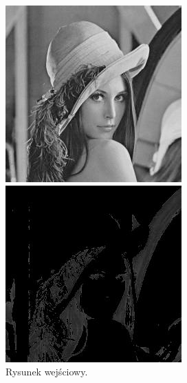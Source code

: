 \documentclass[10pt]{llncs}
\begin{document}
\begin{figure}[!htb]
  \includegraphics[width=\linewidth]{img/02.jpg}
  \caption{Rysunek wejściowy.}\label{fig:4}
\endminipage\hfill
{}
  \includegraphics[width=\linewidth]{img/02_region_01.jpg}

\end{figure}
\end{document}

